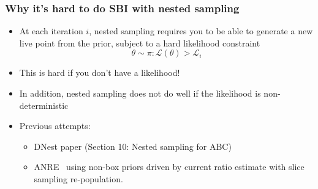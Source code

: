 \documentclass[aspectratio=169]{beamer}
\begin{document}
\begin{frame}
    \frametitle{Why it's hard to do SBI with nested sampling}
    \begin{itemize}
        \item At each iteration $i$, nested sampling requires you to be able to generate a new live point from the prior, subject to a hard likelihood constraint
            \[ \theta\sim\pi : \mathcal{L}(\theta)>\mathcal{L}_i \]
        \item This is hard if you don't have a likelihood!
        \item In addition, nested sampling does not do well if the likelihood is non-deterministic
        \item Previous attempts:
            \begin{itemize}
                \item DNest paper (Section 10: Nested sampling for ABC)
                \item ANRE~ using non-box priors driven by current ratio estimate with slice sampling re-population.
            \end{itemize}
    \end{itemize}
\end{frame}
\end{document}
